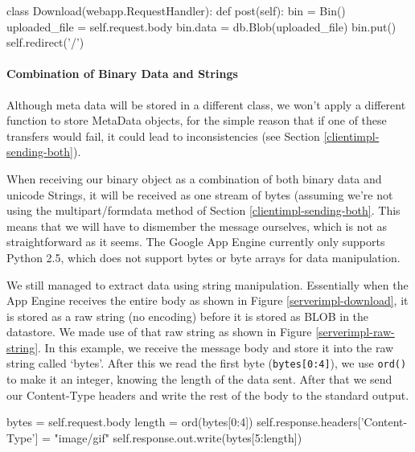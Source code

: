 \begin{figure*}[ht] %
\begin{center}
\begin{code}
class Download(webapp.RequestHandler):
  def post(self):
    bin = Bin()
    uploaded_file = self.request.body
    bin.data = db.Blob(uploaded_file)
    bin.put()
    self.redirect('/')
\end{code}
\caption{Accepting Binary Data.\label{serverimpl-download}}
\end{center}
\end{figure*}
      
\paragraph{Combination of Binary Data and Strings}
Although meta data will be stored in a different class, we won't apply a
different function to store MetaData objects, for the simple reason that if one
of these transfers would fail, it could lead to inconsistencies (see Section
\ref{clientimpl-sending-both}).

When receiving our binary object as a combination of both binary data and
unicode Strings, it will be received as one stream of bytes (assuming we're not
using the multipart/formdata method of Section \ref{clientimpl-sending-both}.
This means that we will have to dismember the message ourselves, which is
not as straightforward as it seems. The Google App Engine currently only
supports Python 2.5, which does not support bytes or byte arrays for data
manipulation.

We still managed to extract data using string manipulation. Essentially when the
App Engine receives the entire body as shown in Figure \ref{serverimpl-download},
it is stored as a raw string (no encoding) before it is stored as BLOB in the
datastore. We made use of that raw string as shown in Figure
\ref{serverimpl-raw-string}. In this example, we receive the message body and
store it into the raw string called `bytes'. After this we read the first byte
(\texttt{bytes[0:4]}), we use \texttt{ord()} to make it an integer, knowing the
length of the data sent. After that we send our Content-Type headers and write
the rest of the body to the standard output.

\begin{figure*}[ht] %
\begin{center}
\begin{code}
bytes = self.request.body
length = ord(bytes[0:4])
self.response.headers['Content-Type'] = "image/gif"
self.response.out.write(bytes[5:length])
\end{code}
\caption{Manipulating a Raw String.\label{serverimpl-raw-string}}
\end{center}
\end{figure*}

